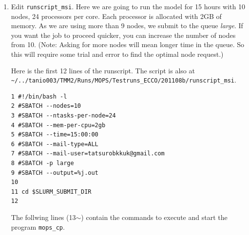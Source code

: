 \documentclass[a4paper]{article}
\begin{document}
\begin{enumerate}
\item Edit \verb|runscript_msi|. Here we are going to run the model for 15 hours with 10 nodes, 24 processors per core. Each processor is allocated with 2GB of memory. As we are using more than 9 nodes, we submit to the queue \textit{large}. If you want the job to proceed quicker, you can increase the number of nodes from 10. (Note: Asking for more nodes will mean longer time in the queue. So this will require some trial and error to find the optimal node request.)

Here is the first 12 lines of the runscript. The script is also at \\ \verb|~/../tanio003/TMM2/Runs/MOPS/Testruns_ECCO/201108b/runscript_msi|.
\lstset{language=sh} 
\begin{lstlisting}[frame=single,basicstyle=\scriptsize]
1 #!/bin/bash -l
2 #SBATCH --nodes=10
3 #SBATCH --ntasks-per-node=24
4 #SBATCH --mem-per-cpu=2gb
5 #SBATCH --time=15:00:00
6 #SBATCH --mail-type=ALL
7 #SBATCH --mail-user=tatsurobkkuk@gmail.com
8 #SBATCH -p large
9 #SBATCH --output=%j.out
10
11 cd $SLURM_SUBMIT_DIR
12
 \end{lstlisting}
 
The follwing lines (13$\sim$) contain the commands to execute and start the program \verb|mops_cp|. 


\end{enumerate}
\end{document}
